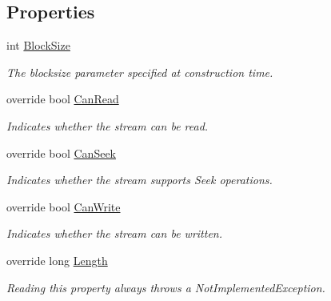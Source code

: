 \subsection*{Properties}
\begin{DoxyCompactItemize}
\item 
int \mbox{\hyperlink{class_super_tiled2_unity_1_1_ionic_1_1_b_zip2_1_1_b_zip2_output_stream_a2be7469ab226833b78e146c24cc5cfcb}{Block\+Size}}
\begin{DoxyCompactList}\small\item\em The blocksize parameter specified at construction time. \end{DoxyCompactList}\item 
override bool \mbox{\hyperlink{class_super_tiled2_unity_1_1_ionic_1_1_b_zip2_1_1_b_zip2_output_stream_addd725a543c527311f522b58ba940bec}{Can\+Read}}
\begin{DoxyCompactList}\small\item\em Indicates whether the stream can be read. \end{DoxyCompactList}\item 
override bool \mbox{\hyperlink{class_super_tiled2_unity_1_1_ionic_1_1_b_zip2_1_1_b_zip2_output_stream_aa3536fcf7c42b4cce702ccc7c464af79}{Can\+Seek}}
\begin{DoxyCompactList}\small\item\em Indicates whether the stream supports Seek operations. \end{DoxyCompactList}\item 
override bool \mbox{\hyperlink{class_super_tiled2_unity_1_1_ionic_1_1_b_zip2_1_1_b_zip2_output_stream_a6a93d6b1f9e52f312874f30b748bf46a}{Can\+Write}}
\begin{DoxyCompactList}\small\item\em Indicates whether the stream can be written. \end{DoxyCompactList}\item 
override long \mbox{\hyperlink{class_super_tiled2_unity_1_1_ionic_1_1_b_zip2_1_1_b_zip2_output_stream_a0c0afbfd277e00496c360a7b415ceb88}{Length}}
\begin{DoxyCompactList}\small\item\em Reading this property always throws a Not\+Implemented\+Exception. \end{DoxyCompactList}\item 

\end{DoxyCompactItemize}
